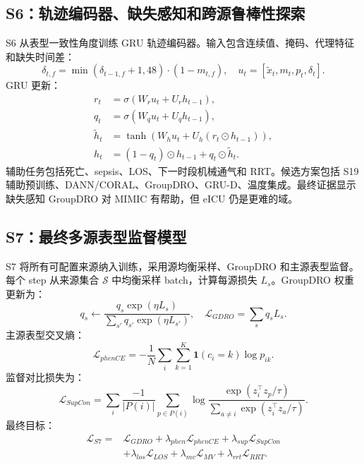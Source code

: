 \documentclass[11pt,a4paper]{article}
\begin{document}
\subsection{S6：轨迹编码器、缺失感知和跨源鲁棒性探索}
S6 从表型一致性角度训练 GRU 轨迹编码器。输入包含连续值、掩码、代理特征和缺失时间差：
\begin{equation}
  \delta_{t,f}=\min(\delta_{t-1,f}+1,48)\cdot(1-m_{t,f}),
  \quad u_t=[\tilde{x}_t,m_t,p_t,\delta_t].
\end{equation}
GRU 更新：
\begin{align}
  r_t&=\sigma(W_r u_t+U_r h_{t-1}),\\
  q_t&=\sigma(W_q u_t+U_q h_{t-1}),\\
  \tilde{h}_t&=\tanh(W_h u_t+U_h(r_t\odot h_{t-1})),\\
  h_t&=(1-q_t)\odot h_{t-1}+q_t\odot\tilde{h}_t.
\end{align}
辅助任务包括死亡、sepsis、LOS、下一时段机械通气和 RRT。候选方案包括 S19 辅助预训练、DANN/CORAL、GroupDRO、GRU-D、温度集成。最终证据显示缺失感知 GroupDRO 对 MIMIC 有帮助，但 eICU 仍是更难的域。

\subsection{S7：最终多源表型监督模型}
S7 将所有可配置来源纳入训练，采用源均衡采样、GroupDRO 和主源表型监督。每个 step 从来源集合 $\mathcal{S}$ 中均衡采样 batch，计算每源损失 $L_s$。GroupDRO 权重更新为：
\begin{equation}
  q_s \leftarrow \frac{q_s\exp(\eta L_s)}{\sum_{s'}q_{s'}\exp(\eta L_{s'})},
  \quad
  \mathcal{L}_{GDRO}=\sum_s q_sL_s.
\end{equation}
主源表型交叉熵：
\begin{equation}
  \mathcal{L}_{phenCE}
  =
  -\frac{1}{N}\sum_i\sum_{k=1}^{K} \mathbf{1}(c_i=k)\log p_{ik}.
\end{equation}
监督对比损失为：
\begin{equation}
  \mathcal{L}_{SupCon}
  =
  \sum_i
  \frac{-1}{|P(i)|}
  \sum_{p\in P(i)}
  \log
  \frac{\exp(z_i^\top z_p/\tau)}
  {\sum_{a\neq i}\exp(z_i^\top z_a/\tau)}.
\end{equation}
最终目标：
\begin{equation}
\begin{split}
  \mathcal{L}_{S7}=&\mathcal{L}_{GDRO}
  +\lambda_{phen}\mathcal{L}_{phenCE}
  +\lambda_{sup}\mathcal{L}_{SupCon}\\
  &+\lambda_{los}\mathcal{L}_{LOS}
  +\lambda_{mv}\mathcal{L}_{MV}
  +\lambda_{rrt}\mathcal{L}_{RRT}.
\end{split}
\end{equation}
\end{document}
